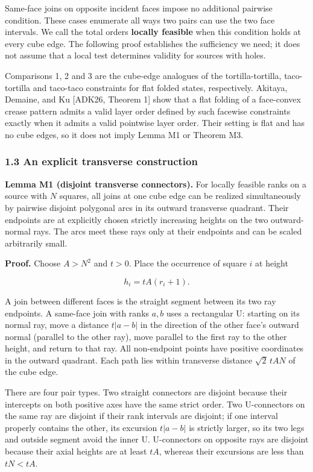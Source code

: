 \documentclass[
  11pt,
]{article}
\begin{document}
Same-face joins on opposite incident faces impose no additional pairwise
condition. These cases enumerate all ways two pairs can use the two face
intervals. We call the total orders \textbf{locally feasible} when this
condition holds at every cube edge. The following proof establishes the
sufficiency we need; it does not assume that a local test determines
validity for sources with holes.

Comparisons 1, 2 and 3 are the cube-edge analogues of the
tortilla-tortilla, taco-tortilla and taco-taco constraints for flat
folded states, respectively. Akitaya, Demaine, and Ku {[}ADK26, Theorem
1{]} show that a flat folding of a face-convex crease pattern admits a
valid layer order defined by such facewise constraints exactly when it
admits a valid pointwise layer order. Their setting is flat and has no
cube edges, so it does not imply Lemma M1 or Theorem M3.

\subsubsection{1.3 An explicit transverse
construction}\label{an-explicit-transverse-construction}

\textbf{Lemma M1 (disjoint transverse connectors).} For locally feasible
ranks on a source with \(N\) squares, all joins at one cube edge can be
realized simultaneously by pairwise disjoint polygonal arcs in its
outward transverse quadrant. Their endpoints are at explicitly chosen
strictly increasing heights on the two outward-normal rays. The arcs
meet these rays only at their endpoints and can be scaled arbitrarily
small.

\textbf{Proof.} Choose \(A>N^2\) and \(t>0\). Place the occurrence of
square \(i\) at height

\[
h_i=tA(r_i+1).
\]

A join between different faces is the straight segment between its two
ray endpoints. A same-face join with ranks \(a,b\) uses a rectangular U:
starting on its normal ray, move a distance \(t\left|a-b\right|\) in the
direction of the other face's outward normal (parallel to the other
ray), move parallel to the first ray to the other height, and return to
that ray. All non-endpoint points have positive coordinates in the
outward quadrant. Each path lies within transverse distance
\(\sqrt2\,tAN\) of the cube edge.

There are four pair types. Two straight connectors are disjoint because
their intercepts on both positive axes have the same strict order. Two
U-connectors on the same ray are disjoint if their rank intervals are
disjoint; if one interval properly contains the other, its excursion
\(t\left|a-b\right|\) is strictly larger, so its two legs and outside
segment avoid the inner U. U-connectors on opposite rays are disjoint
because their axial heights are at least \(tA\), whereas their
excursions are less than \(tN<tA\).
\end{document}
